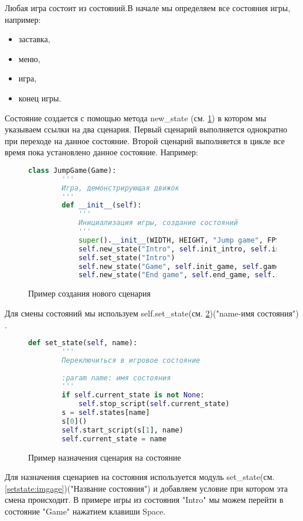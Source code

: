 Любая игра состоит из состояний.В начале мы определяем все состояния игры, например:
\begin{itemize}
	\item заставка,
	\item меню,
	\item игра,
	\item конец игры.
\end{itemize}

Состояние создается с помощью метода new\_state (см. \ref{state:imgage}) в котором мы указываем ссылки на два сценария. Первый сценарий выполняется однократно при переходе на данное состояние. Второй сценарий выполняется в цикле все время пока установлено данное состояние. Например:

\begin{figure}[H]
	\begin{lstlisting}[language=Python]
	class JumpGame(Game):
		'''
		Игра, демонстрирующая движок
		'''
		def __init__(self):
			'''
			Инициализация игры, создание состояний
			'''
			super().__init__(WIDTH, HEIGHT, "Jump game", FPS)
			self.new_state("Intro", self.init_intro, self.intro)
			self.set_state("Intro")
			self.new_state("Game", self.init_game, self.game_script)
			self.new_state("End game", self.end_game, self.start_new_game)
	\end{lstlisting}
	\caption{Пример создания нового сценария}
	\label{state:imgage}
\end{figure}

Для смены состояний мы используем self.set\_state(см. \ref{IntGame:imgage})("name-имя состояния") .

\begin{figure}[H]
	\begin{lstlisting}[language=Python]
	def set_state(self, name):
		'''
		Переключиться в игровое состояние
		
		:param name: имя состояния
		'''
		if self.current_state is not None:
			self.stop_script(self.current_state)
		s = self.states[name]
		s[0]()
		self.start_script(s[1], name)
		self.current_state = name
	\end{lstlisting}
	\caption{Пример назначения сценария на состояние}
	\label{IntGame:imgage}
\end{figure}

Для назначения сценариев на состояния используется модуль set\_state(см. \ref{setstate:imgage})("Название состояния") и добавляем условие при котором эта смена происходит. В примере игры из состояния "Intro" мы можем перейти в состояние "Game" нажатием клавиши Space.

